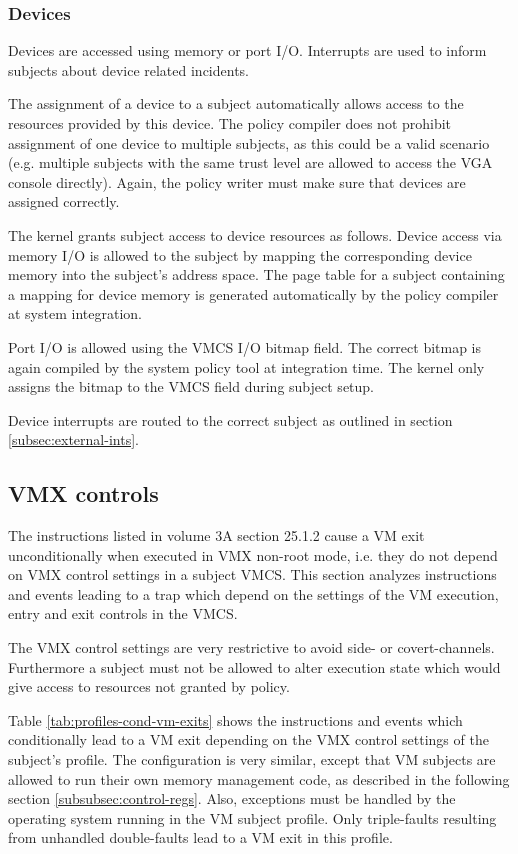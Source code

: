 \subsubsection{Devices}
Devices are accessed using memory or port I/O. Interrupts are used to inform
subjects about device related incidents.

The assignment of a device to a subject automatically allows access to the
resources provided by this device. The policy compiler does not prohibit
assignment of one device to multiple subjects, as this could be a valid scenario
(e.g.  multiple subjects with the same trust level are allowed to access the VGA
console directly). Again, the policy writer must make sure that devices are
assigned correctly.

The kernel grants subject access to device resources as follows. Device access
via memory I/O is allowed to the subject by mapping the corresponding device
memory into the subject's address space. The page table for a subject containing
a mapping for device memory is generated automatically by the policy compiler at
system integration.

Port I/O is allowed using the VMCS I/O bitmap field. The correct bitmap is again
compiled by the system policy tool at integration time. The kernel only assigns
the bitmap to the VMCS field during subject setup.

Device interrupts are routed to the correct subject as outlined in section
\ref{subsec:external-ints}.

\subsection{VMX controls}\label{subsec:vmx-controls}
The instructions listed in \cite{IntelSDM} volume 3A section 25.1.2 cause a VM
exit unconditionally when executed in VMX non-root mode, i.e. they do not depend
on VMX control settings in a subject VMCS. This section analyzes instructions
and events leading to a trap which depend on the settings of the VM execution,
entry and exit controls in the VMCS.

The VMX control settings are very restrictive to avoid side- or covert-channels.
Furthermore a subject must not be allowed to alter execution state which would
give access to resources not granted by policy.

Table \ref{tab:profiles-cond-vm-exits} shows the instructions and events which
conditionally lead to a VM exit depending on the VMX control settings of the
subject's profile. The configuration is very similar, except that VM subjects
are allowed to run their own memory management code, as described in the
following section \ref{subsubsec:control-regs}. Also, exceptions must be handled
by the operating system running in the VM subject profile. Only triple-faults
resulting from unhandled double-faults lead to a VM exit in this profile.

